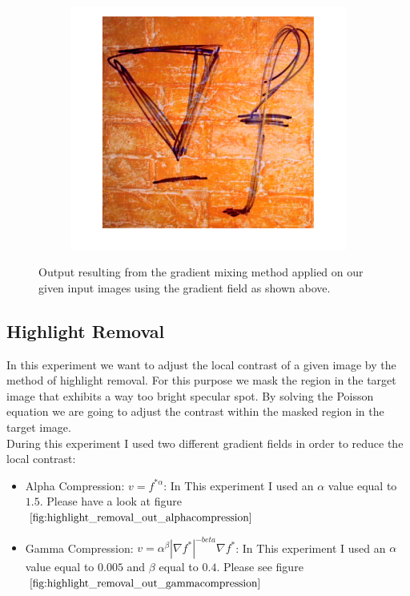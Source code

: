 \documentclass{paper}
\begin{document}
\begin{figure}[H]
    \centering
    \begin{subfigure}{1.0\textwidth}
        \includegraphics[width=\textwidth]{../../outputs/p4/gradient_mixing/output}
    \end{subfigure}
    \caption{Output resulting from the gradient mixing method applied on our given input images using the gradient field as shown above.}
    \label{fig:gradient_mixing_out}       
\end{figure}

\subsection{Highlight Removal}

In this experiment we want to adjust the local contrast of a given image by the method of highlight removal. For this purpose we mask the region in the target image that exhibits a way too bright specular spot. By solving the Poisson equation we are going to adjust the contrast within the masked region in the target image. \\

During this experiment I used two different gradient fields in order to reduce the local contrast:

\begin{itemize}
\item Alpha Compression: $v = f^{* \alpha}$: In This experiment I used an $\alpha$ value equal to $1.5$. Please have a look at figure $\ref{fig:highlight_removal_out_alphacompression}$
\item Gamma Compression: $v = \alpha^{\beta} |\nabla f^{*}|^{-beta} \nabla f^{*}$: In This experiment I used an $\alpha$ value equal to $0.005$ and $\beta$ equal to $0.4$. Please see figure $\ref{fig:highlight_removal_out_gammacompression}$

\end{itemize}
\end{document}
